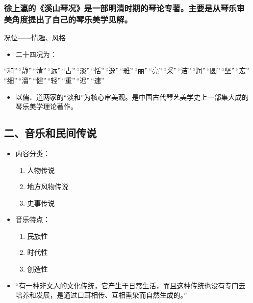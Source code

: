 \documentclass[
]{article}
\providecommand{\tightlist}{%
  \setlength{\itemsep}{0pt}\setlength{\parskip}{0pt}}
\begin{document}
\subsubsection{徐上瀛的《溪山琴况》是一部明清时期的琴论专著。主要是从琴乐审美角度提出了自己的琴乐美学见解。}\label{ux5f90ux4e0aux701bux7684ux6eaaux5c71ux7434ux51b5ux662fux4e00ux90e8ux660eux6e05ux65f6ux671fux7684ux7434ux8bbaux4e13ux8457ux4e3bux8981ux662fux4eceux7434ux4e50ux5ba1ux7f8eux89d2ux5ea6ux63d0ux51faux4e86ux81eaux5df1ux7684ux7434ux4e50ux7f8eux5b66ux89c1ux89e3}

况位------情趣、风格

\begin{itemize}
\tightlist
\item
  二十四况为：
\end{itemize}

``和''\,``静''\,``清''\,``远''\,``古''\,``淡''\,``恬''\,``逸''\,``雅''\,``丽''\,``亮''\,``采''\,``洁''\,``润''\,``圆''\,``坚''\,``宏''\,``细''\,``溜''\,``健''\,``轻''\,``重''\,``迟''\,``速''

\begin{itemize}
\tightlist
\item
  以儒、道两家的``淡和''为核心审美观。是中国古代琴艺美学史上一部集大成的琴乐美学理论著作。
\end{itemize}

\subsection{二、音乐和民间传说}\label{ux4e8cux97f3ux4e50ux548cux6c11ux95f4ux4f20ux8bf4}

\begin{itemize}
\tightlist
\item
  内容分类：

  \begin{enumerate}
  \tightlist
  \item
    人物传说
  \item
    地方风物传说
  \item
    史事传说
  \end{enumerate}
\item
  音乐特点：

  \begin{enumerate}
  \tightlist
  \item
    民族性
  \item
    时代性
  \item
    创造性
  \end{enumerate}
\item
  ``有一种非文人的文化传统，它产生于日常生活，而且这种传统也没有专门去培养和发展，是通过口耳相传、互相熏染而自然生成的。''
\end{itemize}
\end{document}
